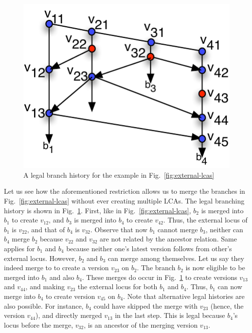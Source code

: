 

\begin{figure}
\centering
\includegraphics[scale=0.75]{Figures/legal-merge}

\caption{A legal branch history for the example in
Fig.~\ref{fig:external-lcas}}
\label{fig:legal-merge}
\end{figure}


Let us see how the aforementioned restriction allows us to merge the
branches in Fig.~\ref{fig:external-lcas} without ever creating
multiple LCAs. The legal branching history is shown in
Fig.~\ref{fig:legal-merge}. First, like in
Fig.~\ref{fig:external-lcas}, $b_2$ is merged into $b_1$ to create
$v_{12}$, and $b_3$ is merged into $b_4$ to create $v_{42}$. Thus, the
external locus of $b_1$ is $v_{22}$, and that of $b_4$ is $v_{32}$.
Observe that now $b_1$ cannot merge $b_3$, neither can $b_4$ merge
$b_2$ because $v_{22}$ and $v_{32}$ are not related by the ancestor
relation. Same applies for $b_1$ and $b_4$ because neither one's
latest version follows from other's external locus.  However, $b_2$
and $b_3$ can merge among themselves. Let us say they indeed merge to
to create a version $v_{23}$ on $b_2$. The branch $b_2$ is now
eligible to be merged into $b_1$ and also $b_4$. These merges do occur
in Fig.~\ref{fig:legal-merge} to create versions $v_{13}$ and
$v_{44}$, and making $v_{23}$ the external locus for both $b_1$ and
$b_4$. Thus, $b_1$ can now merge into $b_4$ to create version $v_{45}$
on $b_4$. Note that alternative legal histories are also possible. For
instance, $b_4$ could have skipped the merge with $v_{23}$ (hence, the
version $v_{44}$), and directly merged $v_{13}$ in the last step.
This is legal because $b_4$'s locus before the merge, $v_{32}$, is an
ancestor of the merging version $v_{13}$.

